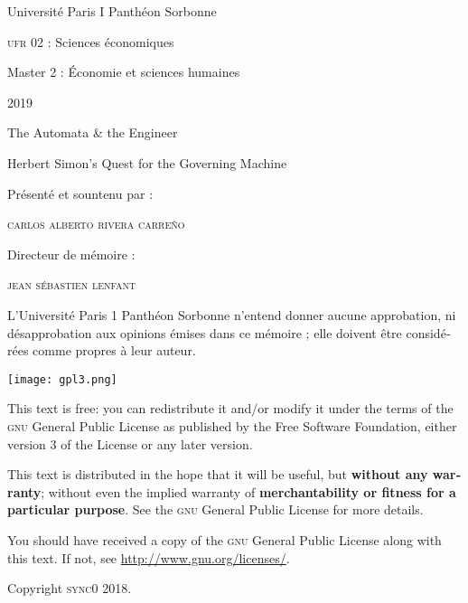 \documentclass[draft=false, paper=A4,portrait,twoside=true,twocolumn=false,headinclude=false,footinclude=false,fontsize=11,BCOR=15mm,DIV=calc,pagesize=auto,titlepage=firstiscover,mpinclude=true,headings=big,headings=twolinechapter,open=right,chapterprefix=false,headsepline=false,parskip=full]{scrbook}
\author{Carlos Alberto Rivera Carreño}
\date{}
\title{}
\begin{document}
\begin{titlepage}
 \centering
 \vspace{4\baselineskip}
\begin{french}
 {\Large Université Paris I Panthéon Sorbonne \par}
 {\Large \textsc{ufr} 02 : Sciences économiques  \par}
 {\large Master 2 : Économie et sciences humaines \par}
 {\large 2019 \par}
\end{french}
 \vspace{2\baselineskip}
 {\huge The Automata \& the Engineer \par}
 {\Large Herbert Simon's Quest for the Governing Machine \par}
\vspace*{\fill}
\begin{french}
 {\large Présenté et sountenu par : \par}
\end{french}
 {\large \textsc{carlos alberto rivera carreño}\par}
 \vspace{1\baselineskip}
\begin{french}
 {\large Directeur de mémoire : \par}
\end{french}
 {\large \textsc{jean sébastien lenfant}\par}
\end{titlepage}

\pagestyle{empty}

\begin{french}
L'Université Paris 1 Panthéon Sorbonne n'entend donner aucune approbation,
ni désapprobation aux opinions émises dans ce mémoire ; elle doivent être
considérées comme propres à leur auteur. 
\end{french}

\newpage
\vspace*{\fill}
\noindent
\texttt{[image: gpl3.png]}\par
\vspace{1\baselineskip}
\begin{english}
This text is free: you can redistribute it and/or modify it
under the terms of the \textsc{gnu} General Public License as published by
the Free Software Foundation, either version 3 of the License or any later
version.

This text is distributed in the hope that it will be useful, but \textbf{without
any warranty}; without even the implied warranty of \textbf{merchantability or 
fitness for a particular purpose}. See the \textsc{gnu} General 
Public License for more details.

You should have received a copy of the \textsc{gnu} General Public License along
with this text. If not, see \url{http://www.gnu.org/licenses/}.

\vspace{1\baselineskip}
\noindent
Copyright \textcopyright \textsc{sync0} 2018. 
\end{english}
\end{document}
